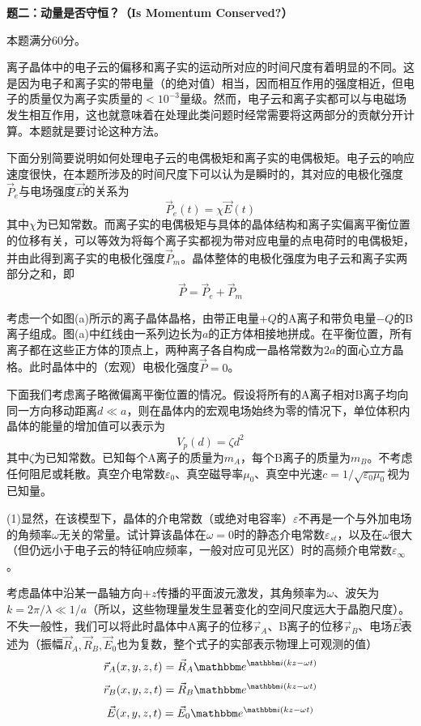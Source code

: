 \documentclass[11pt,a4paper,onecolumn,UTF8]{ctexart}
\begin{document}
	
	
	\noindent
	\textbf{题二：动量是否守恒？（Is Momentum Conserved?）}
	
	本题满分60分。
	
	离子晶体中的电子云的偏移和离子实的运动所对应的时间尺度有着明显的不同。这是因为电子和离子实的带电量（的绝对值）相当，因而相互作用的强度相近，但电子的质量仅为离子实质量的$<10^{-3}$量级。然而，电子云和离子实都可以与电磁场发生相互作用，这也就意味着在处理此类问题时经常需要将这两部分的贡献分开计算。本题就是要讨论这种方法。
	
	下面分别简要说明如何处理电子云的电偶极矩和离子实的电偶极矩。电子云的响应速度很快，在本题所涉及的时间尺度下可以认为是瞬时的，其对应的电极化强度$\vec P_e$与电场强度$\vec E$的关系为
	\begin{equation*}
		\vec{P}_e(t)=\chi\vec E(t)
	\end{equation*}
	其中$\chi$为已知常数。而离子实的电偶极矩与具体的晶体结构和离子实偏离平衡位置的位移有关，可以等效为将每个离子实都视为带对应电量的点电荷时的电偶极矩，并由此得到离子实的电极化强度$\vec P_m$。晶体整体的电极化强度为电子云和离子实两部分之和，即
	\begin{equation*}
		\vec P=\vec P_e+\vec P_m
	\end{equation*}
	
	考虑一个如图(a)所示的离子晶体晶格，由带正电量$+Q$的A离子和带负电量$-Q$的B离子组成。图(a)中红线由一系列边长为$a$的正方体相接地拼成。在平衡位置，所有离子都在这些正方体的顶点上，两种离子各自构成一晶格常数为$2a$的面心立方晶格。此时晶体中的（宏观）电极化强度$\vec P=0$。
	
	下面我们考虑离子略微偏离平衡位置的情况。假设将所有的A离子相对B离子均向同一方向移动距离$d\ll a$，则在晶体内的宏观电场始终为零的情况下，单位体积内晶体的能量的增加值可以表示为
	\begin{equation*}
		V_p(d)=\zeta d^2
	\end{equation*}
	其中$\zeta$为已知常数。已知每个A离子的质量为$m_A$，每个B离子的质量为$m_B$。不考虑任何阻尼或耗散。真空介电常数$\varepsilon_{0}$、真空磁导率$\mu_0$、真空中光速$c=1/\sqrt{\varepsilon_{0}\mu_0}$视为已知量。
	
	(1)显然，在该模型下，晶体的介电常数（或绝对电容率）$\varepsilon$不再是一个与外加电场的角频率$\omega$无关的常量。试计算该晶体在$\omega=0$时的静态介电常数$\varepsilon_{st}$，以及在$\omega$很大（但仍远小于电子云的特征响应频率，一般对应可见光区）时的高频介电常数$\varepsilon_{\infty}$。
	
	考虑晶体中沿某一晶轴方向$+z$传播的平面波元激发，其角频率为$\omega$、波矢为$k=2\pi/\lambda\ll 1/a$（所以，这些物理量发生显著变化的空间尺度远大于晶胞尺度）。不失一般性，我们可以将此时晶体中A离子的位移$\vec{r}_A$、B离子的位移$\vec{r}_B$、电场$\vec E$表述为（振幅$\vec R_A,\vec R_B,\vec E_0$也为复数，整个式子的实部表示物理上可观测的值）
	\begin{equation*}
		\vec r_A(x,y,z,t)=\vec R_A\ue^{\ui(kz-\omega t)}
	\end{equation*}
	\begin{equation*}
		\vec r_B(x,y,z,t)=\vec R_B\ue^{\ui(kz-\omega t)}
	\end{equation*}
	\begin{equation*}
		\vec E(x,y,z,t)=\vec E_0\ue^{\ui(kz-\omega t)}
	\end{equation*}
	
\end{document}
